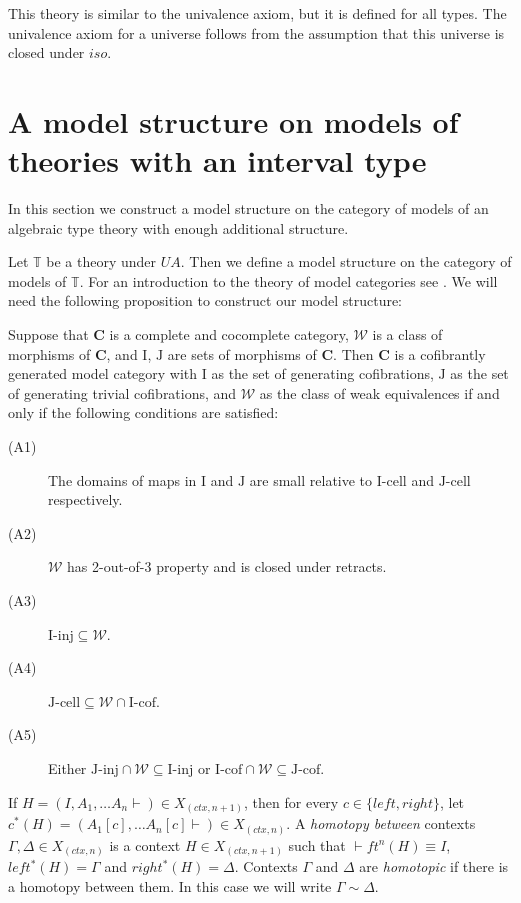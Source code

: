 \documentclass[reqno]{amsart}
\theoremstyle{definition}
\theoremstyle{remark}
\newcommand{\cat}[1]{\mathbf{#1}}
\newcommand{\C}{\cat{C}}
\newcommand{\we}{\mathcal{W}}
\newcommand{\I}{\mathrm{I}}
\newcommand{\J}{\mathrm{J}}
\newcommand{\class}[2]{#1\text{-}\mathrm{#2}}
\newcommand{\Iinj}[1][\I]{\class{#1}{inj}}
\newcommand{\Icell}[1][\I]{\class{#1}{cell}}
\newcommand{\Icof}[1][\I]{\class{#1}{cof}}
\newcommand{\Jinj}[1][]{\Iinj[\J#1]}
\newcommand{\Jcell}[1][]{\Icell[\J#1]}
\newcommand{\Jcof}[1][]{\Icof[\J#1]}
\numberwithin{figure}{section}
\begin{document}
This theory is similar to the univalence axiom, but it is defined for all types.
The univalence axiom for a universe follows from the assumption that this universe is closed under $iso$.


\section{A model structure on models of theories with an interval type}

In this section we construct a model structure on the category of models of an algebraic type theory with enough additional structure.

Let $\mathbb{T}$ be a theory under $UA$.
Then we define a model structure on the category of models of $\mathbb{T}$.
For an introduction to the theory of model categories see \cite{hovey}.
We will need the following proposition to construct our model structure:

\begin{prop}
Suppose that $\C$ is a complete and cocomplete category, $\we$ is a class of morphisms of $\C$, and $\I$, $\J$ are sets of morphisms of $\C$.
Then $\C$ is a cofibrantly generated model category with $\I$ as the set of generating cofibrations,
$\J$ as the set of generating trivial cofibrations, and $\we$ as the class of weak equivalences if and only if the following conditions are satisfied:
\begin{description}
\item[(A1)] The domains of maps in $\I$ and $\J$ are small relative to $\Icell$ and $\Jcell$ respectively.
\item[(A2)] $\we$ has 2-out-of-3 property and is closed under retracts.
\item[(A3)] $\Iinj \subseteq \we$.
\item[(A4)] $\Jcell \subseteq \we \cap \Icof$.
\item[(A5)] Either $\Jinj \cap \we \subseteq \Iinj$ or $\Icof \cap \we \subseteq \Jcof$.
\end{description}
\end{prop}

If $H = (I, A_1, \ldots A_n \vdash) \in X_{(ctx,n+1)}$, then for every $c \in \{ left, right \}$, let $c^*(H) = (A_1[c], \ldots A_n[c] \vdash) \in X_{(ctx,n)}$.
A \emph{homotopy between} contexts $\Gamma,\Delta \in X_{(ctx,n)}$ is a context $H \in X_{(ctx,n+1)}$ such that $\vdash ft^n(H) \equiv I$, $left^*(H) = \Gamma$ and $right^*(H) = \Delta$.
Contexts $\Gamma$ and $\Delta$ are \emph{homotopic} if there is a homotopy between them.
In this case we will write $\Gamma \sim \Delta$.
\end{document}
